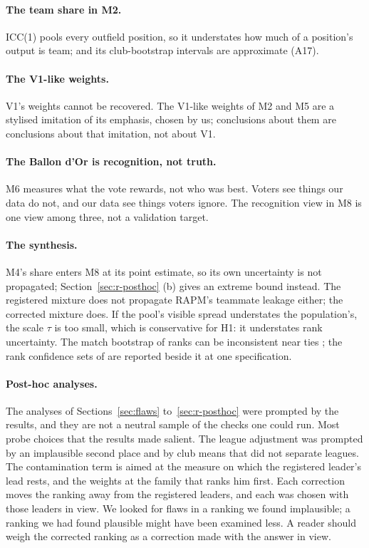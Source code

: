 \documentclass[11pt,a4paper]{article}
\begin{document}
\paragraph{The team share in M2.}
ICC(1) pools every outfield position, so it understates how much of a
position's output is team; and its club-bootstrap intervals are approximate
(A17).

\paragraph{The V1-like weights.}
V1's weights cannot be recovered. The V1-like weights of M2 and M5 are a
stylised imitation of its emphasis, chosen by us; conclusions about them are
conclusions about that imitation, not about V1.

\paragraph{The Ballon d'Or is recognition, not truth.}
M6 measures what the vote rewards, not who was best. Voters see things our
data do not, and our data see things voters ignore. The recognition view in M8
is one view among three, not a validation target.

\paragraph{The synthesis.}
M4's share enters M8 at its point estimate, so its own uncertainty is not
propagated; Section~\ref{sec:r-posthoc} (b) gives an extreme bound instead.
The registered mixture does not propagate RAPM's teammate leakage either; the
corrected mixture does. If the pool's visible spread understates the population's, the
scale $\tau$ is too small, which is conservative for H1: it understates rank
uncertainty. The match bootstrap of ranks can be inconsistent near ties
\citep{hall2009bootstrap}; the rank confidence sets of \citet{mogstad2024ranks}
are reported beside it at one specification.

\paragraph{Post-hoc analyses.}
The analyses of Sections~\ref{sec:flaws} to~\ref{sec:r-posthoc} were prompted
by the results, and they are not a neutral sample of the checks one could run.
Most probe choices that the results made salient. The league adjustment was
prompted by an implausible second place and by club means that did not
separate leagues. The contamination term is aimed at the measure on which the
registered leader's lead rests, and the weights at the family that ranks him
first. Each correction moves the ranking away from the registered leaders, and
each was chosen with those leaders in view. We looked for flaws in a ranking
we found implausible; a ranking we had found plausible might have been
examined less. A reader should weigh the corrected ranking as a correction
made with the answer in view.
\end{document}
